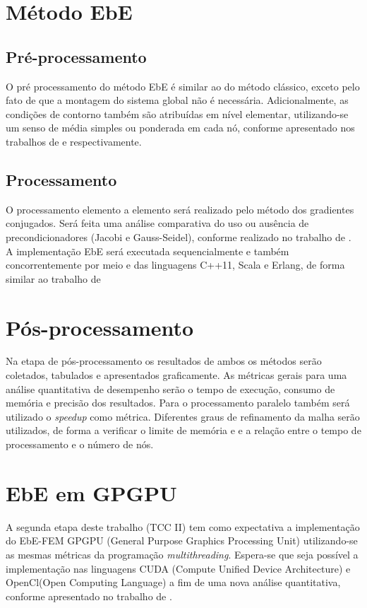 \documentclass[
    12pt,               %
    openright,          %
    oneside,
    a4paper,            %
    english,            %
    french,             %
    spanish,            %
    brazil              %
    ]{abntex2}
\begin{document}
	\section{Método EbE}
	\subsection{Pré-processamento}
	O pré processamento do método EbE é similar ao do método clássico, exceto pelo fato de que a montagem do sistema global não é necessária. Adicionalmente, as condições de contorno também são atribuídas em nível elementar, utilizando-se um senso de média simples ou ponderada em cada nó, conforme apresentado nos trabalhos de  e  respectivamente. 
	
	\subsection{Processamento}
	O processamento elemento a elemento será realizado pelo método dos gradientes conjugados. Será feita uma análise comparativa do uso ou ausência de precondicionadores (Jacobi e Gauss-Seidel), conforme realizado no trabalho de .
	A implementação EbE será executada sequencialmente e também concorrentemente por meio e das linguagens C++11, Scala e Erlang, de forma similar ao trabalho de 
	
	\section{Pós-processamento}
	Na etapa de pós-processamento os resultados de ambos os métodos serão coletados, tabulados e apresentados graficamente. As métricas gerais para uma análise quantitativa de desempenho serão o tempo de execução, consumo de memória e precisão dos resultados.
	Para o processamento paralelo também será utilizado o \textit{speedup} como métrica. 
	 Diferentes graus de refinamento da malha serão utilizados, de forma a verificar o limite de memória e e a relação entre o tempo de processamento e o número de nós.
	 
	\section{EbE em GPGPU}	
	 A segunda etapa deste trabalho (TCC II) tem como expectativa a implementação do EbE-FEM GPGPU (General Purpose Graphics Processing Unit) utilizando-se as mesmas métricas da programação \textit{multithreading}. Espera-se que seja possível a implementação nas linguagens CUDA (Compute Unified Device Architecture) e OpenCl(Open Computing Language) a fim de uma nova análise quantitativa, conforme apresentado no trabalho de .
	
\end{document}
